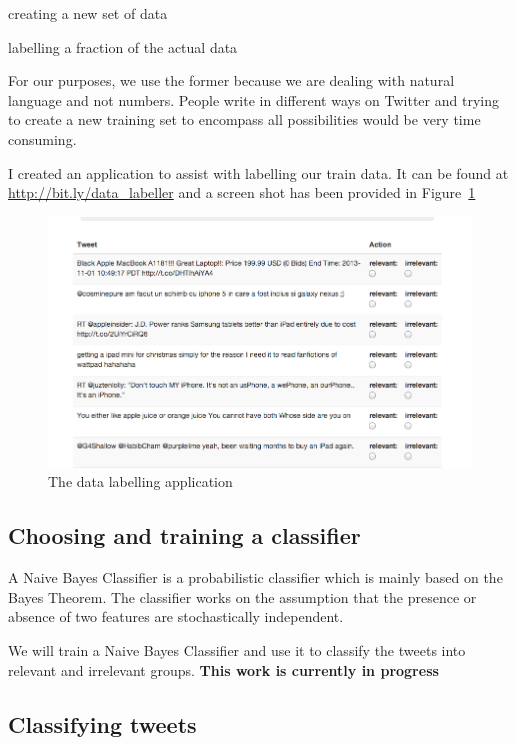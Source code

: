 \begin{enumerate*}
[label=\itshape\alph*\ushape)]
  \item creating a new set of data
  \item labelling a fraction of the actual data
\end{enumerate*}

For our purposes, we use the former because we are dealing with natural language and not numbers.
People write in different ways on Twitter and trying to create a new training set to encompass all
possibilities would be very time consuming.

I created an application to assist with labelling our train data. It can be found at
\url{http://bit.ly/data\_labeller} and a screen shot has been provided in Figure~\ref{fig:labeller}

\begin{figure}
  \begin{center}
    \includegraphics[scale=0.4]{Figures/datalabeller}
  \end{center}
  \caption{The data labelling application}
\label{fig:labeller}
\end{figure}


\subsection{Choosing and training a classifier}
A Naive Bayes Classifier is a probabilistic classifier which is mainly based on the Bayes Theorem.
The classifier works on the assumption that the presence or absence of two features are
stochastically independent.

We will train a Naive Bayes Classifier and use it to classify the tweets into relevant and
irrelevant groups. \textbf{This work is currently in progress}

\subsection{Classifying tweets}
